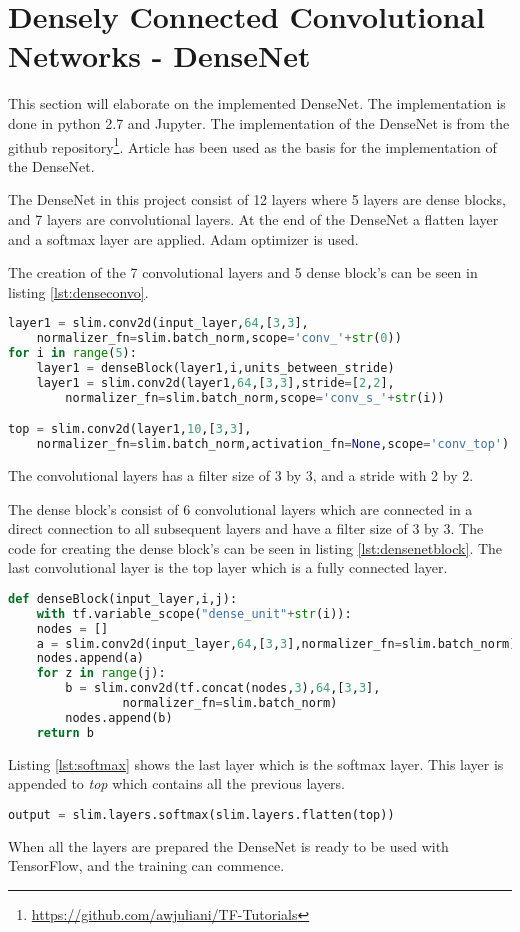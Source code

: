 \section{Densely Connected Convolutional Networks - DenseNet}

This section will elaborate on the implemented DenseNet. The implementation is done in python 2.7 and Jupyter. The implementation of the DenseNet is from the github repository\footnote{\url{https://github.com/awjuliani/TF-Tutorials}}. Article \citep{DENSE} has been used as the basis for the implementation of the DenseNet.

The DenseNet in this project consist of 12 layers where 5 layers are dense blocks, and 7 layers are convolutional layers. At the end of the DenseNet a flatten layer and a softmax layer are applied. Adam optimizer is used.

The creation of the 7 convolutional layers and 5 dense block's can be seen in listing \ref{lst:denseconvo}.

\begin{lstlisting}[language=Python, label=lst:denseconvo, caption=for loop which creates the dense block's mixed with the convolutional layers]
layer1 = slim.conv2d(input_layer,64,[3,3],
	normalizer_fn=slim.batch_norm,scope='conv_'+str(0))
for i in range(5):
	layer1 = denseBlock(layer1,i,units_between_stride)
	layer1 = slim.conv2d(layer1,64,[3,3],stride=[2,2],
		normalizer_fn=slim.batch_norm,scope='conv_s_'+str(i))

top = slim.conv2d(layer1,10,[3,3],
	normalizer_fn=slim.batch_norm,activation_fn=None,scope='conv_top')
\end{lstlisting}

The convolutional layers has a filter size of 3 by 3, and a stride with 2 by 2. 

The dense block's consist of 6 convolutional layers which are connected in a direct connection to all subsequent layers and have a filter size of 3 by 3. The code for creating the dense block's can be seen in listing \ref{lst:densenetblock}. The last convolutional layer is the top layer which is a fully connected layer.

\begin{lstlisting}[language=Python, label=lst:densenetblock, caption=DenseNet Block function]
def denseBlock(input_layer,i,j):
	with tf.variable_scope("dense_unit"+str(i)):
	nodes = []
	a = slim.conv2d(input_layer,64,[3,3],normalizer_fn=slim.batch_norm)
	nodes.append(a)
	for z in range(j):
		b = slim.conv2d(tf.concat(nodes,3),64,[3,3],
				normalizer_fn=slim.batch_norm)
		nodes.append(b)
	return b
\end{lstlisting}

Listing \ref{lst:softmax} shows the last layer which is the softmax layer. This layer is appended to \emph{top} which contains all the previous layers.

\begin{lstlisting}[language=Python, label=lst:softmax, caption=Softmax layer appended to the end of the DenseNet]
output = slim.layers.softmax(slim.layers.flatten(top))
\end{lstlisting}

When all the layers are prepared the DenseNet is ready to be used with TensorFlow, and the training can commence.